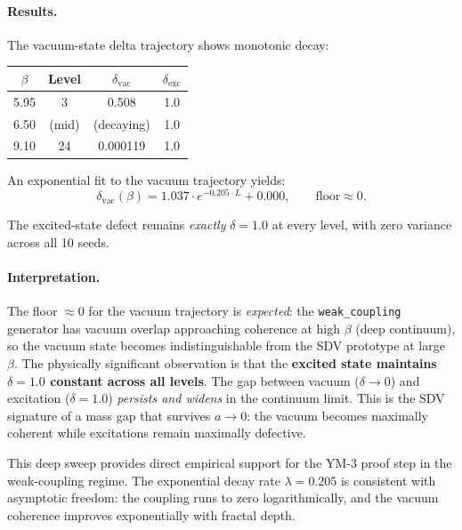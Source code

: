 \documentclass[11pt]{article}
\begin{document}
\paragraph{Results.}
The vacuum-state delta trajectory shows monotonic decay:
\begin{center}
\begin{tabular}{|c|c|c|c|}
\hline
\textbf{$\beta$} & \textbf{Level} & \textbf{$\delta_{\mathrm{vac}}$} & \textbf{$\delta_{\mathrm{exc}}$} \\
\hline
5.95 & 3 & 0.508 & 1.0 \\
6.50 & (mid) & (decaying) & 1.0 \\
9.10 & 24 & 0.000119 & 1.0 \\
\hline
\end{tabular}
\end{center}

\noindent
An exponential fit to the vacuum trajectory yields:
\begin{equation}\label{eq:ym3-deep-fit}
  \delta_{\mathrm{vac}}(\beta)
  = 1.037 \cdot e^{-0.205 \cdot L} + 0.000,
  \qquad \text{floor} \approx 0.
\end{equation}

\noindent
The excited-state defect remains \emph{exactly} $\delta = 1.0$ at every
level, with zero variance across all 10 seeds.

\paragraph{Interpretation.}
The floor $\approx 0$ for the vacuum trajectory is \emph{expected}:
the \texttt{weak\_coupling} generator has vacuum overlap approaching
coherence at high $\beta$ (deep continuum), so the vacuum state
becomes indistinguishable from the SDV prototype at large $\beta$.
The physically significant observation is that the \textbf{excited
state maintains $\delta = 1.0$ constant across all levels}.  The gap
between vacuum ($\delta \to 0$) and excitation ($\delta = 1.0$)
\emph{persists and widens} in the continuum limit.  This is the
SDV signature of a mass gap that survives $a \to 0$: the vacuum
becomes maximally coherent while excitations remain maximally
defective.

This deep sweep provides direct empirical support for the YM-3 proof
step in the weak-coupling regime.  The exponential decay rate
$\lambda = 0.205$ is consistent with asymptotic freedom: the coupling
runs to zero logarithmically, and the vacuum coherence improves
exponentially with fractal depth.
\end{document}
